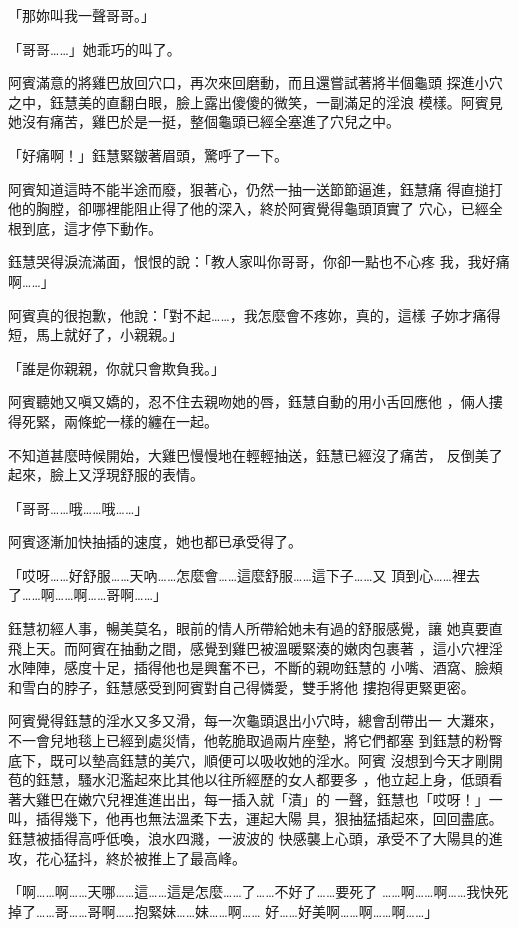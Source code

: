 「那妳叫我一聲哥哥。」

「哥哥……」她乖巧的叫了。

阿賓滿意的將雞巴放回穴口，再次來回磨動，而且還嘗試著將半個龜頭
探進小穴之中，鈺慧美的直翻白眼，臉上露出傻傻的微笑，一副滿足的淫浪
模樣。阿賓見她沒有痛苦，雞巴於是一挺，整個龜頭已經全塞進了穴兒之中。

「好痛啊！」鈺慧緊皺著眉頭，驚呼了一下。

阿賓知道這時不能半途而廢，狠著心，仍然一抽一送節節逼進，鈺慧痛
得直搥打他的胸膛，卻哪裡能阻止得了他的深入，終於阿賓覺得龜頭頂實了
穴心，已經全根到底，這才停下動作。

鈺慧哭得淚流滿面，恨恨的說：「教人家叫你哥哥，你卻一點也不心疼
我，我好痛啊……」

阿賓真的很抱歉，他說：「對不起……，我怎麼會不疼妳，真的，這樣
子妳才痛得短，馬上就好了，小親親。」

「誰是你親親，你就只會欺負我。」

阿賓聽她又嗔又嬌的，忍不住去親吻她的唇，鈺慧自動的用小舌回應他
，倆人摟得死緊，兩條蛇一樣的纏在一起。

不知道甚麼時候開始，大雞巴慢慢地在輕輕抽送，鈺慧已經沒了痛苦，
反倒美了起來，臉上又浮現舒服的表情。

「哥哥……哦……哦……」

阿賓逐漸加快抽插的速度，她也都已承受得了。

「哎呀……好舒服……天吶……怎麼會……這麼舒服……這下子……又
頂到心……裡去了……啊……啊……哥啊……」

鈺慧初經人事，暢美莫名，眼前的情人所帶給她未有過的舒服感覺，讓
她真要直飛上天。而阿賓在抽動之間，感覺到雞巴被溫暖緊湊的嫩肉包裹著
，這小穴裡淫水陣陣，感度十足，插得他也是興奮不已，不斷的親吻鈺慧的
小嘴、酒窩、臉頰和雪白的脖子，鈺慧感受到阿賓對自己得憐愛，雙手將他
摟抱得更緊更密。

阿賓覺得鈺慧的淫水又多又滑，每一次龜頭退出小穴時，總會刮帶出一
大灘來，不一會兒地毯上已經到處災情，他乾脆取過兩片座墊，將它們都塞
到鈺慧的粉臀底下，既可以墊高鈺慧的美穴，順便可以吸收她的淫水。阿賓
沒想到今天才剛開苞的鈺慧，騷水氾濫起來比其他以往所經歷的女人都要多
，他立起上身，低頭看著大雞巴在嫩穴兒裡進進出出，每一插入就「漬」的
一聲，鈺慧也「哎呀！」一叫，插得幾下，他再也無法溫柔下去，運起大陽
具，狠抽猛插起來，回回盡底。鈺慧被插得高呼低喚，浪水四濺，一波波的
快感襲上心頭，承受不了大陽具的進攻，花心猛抖，終於被推上了最高峰。

「啊……啊……天哪……這……這是怎麼……了……不好了……要死了
……啊……啊……我快死掉了……哥……哥啊……抱緊妹……妹……啊……
好……好美啊……啊……啊……」

